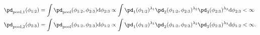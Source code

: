 \begin{align}
  \pd_{\text{pool}, 1} (\phi_{1:2}) &= 
    \int \pd_{\text{pool}} (\phi_{1:2}, \phi_{2:3}) \text{d}\phi_{2:3} 
    \propto
    \int 
      \pd_{1}(\phi_{1:2})^{\lambda_{1}}
      \pd_{2}(\phi_{1:2}, \phi_{2:3})^{\lambda_{2}}
      \pd_{3}(\phi_{2:3})^{\lambda_{3}}
    \text{d}\phi_{2:3} 
    < \infty
    \\
  \pd_{\text{pool}, 2} (\phi_{2:3}) &= 
    \int \pd_{\text{pool}} (\phi_{1:2}, \phi_{2:3}) \text{d}\phi_{1:2} 
    \propto
    \int 
      \pd_{1}(\phi_{1:2})^{\lambda_{1}}
      \pd_{2}(\phi_{1:2}, \phi_{2:3})^{\lambda_{2}}
      \pd_{3}(\phi_{2:3})^{\lambda_{3}}
    \text{d}\phi_{1:2}
    < \infty.
  \label{eqn:pooled-marginals}
\end{align}